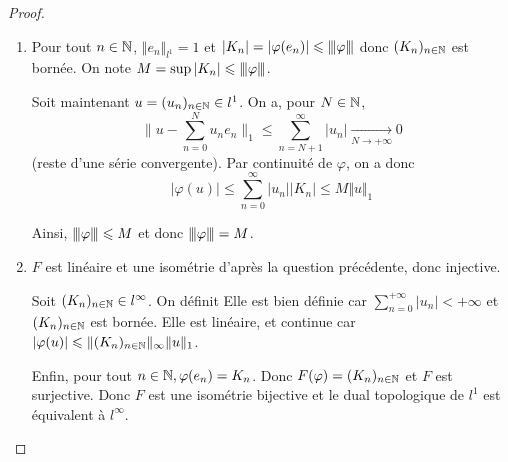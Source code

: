\begin{proof}
	\phantom{}
	\begin{enumerate}
		\item Pour tout $n\in\mathbb{N}$, $\Vert e_{n}\Vert_{l^{1}}=1$ et $\vert K_{n}\vert=\vert\varphi(e_{n})\vert\leqslant{\left\vert\kern-0.25ex\left\vert\kern-0.25ex\left\vert{}\varphi \right\vert\kern-0.25ex\right\vert\kern-0.25ex\right\vert}$ donc $(K_{n})_{n\in\mathbb{N}}$ est bornée. On note $M=\sup\vert K_{n}\vert\leqslant{\left\vert\kern-0.25ex\left\vert\kern-0.25ex\left\vert{}\varphi \right\vert\kern-0.25ex\right\vert\kern-0.25ex\right\vert}$.
		
		Soit maintenant $u=(u_{n})_{n\in\mathbb{N}}\in l^{1}$. On a, pour $N\in\mathbb{N}$, 
		\begin{equation}\Biggl\lVert u-\sum_{n=0}^{N}u_{n}e_{n}\Biggr\rVert_{1}\leqslant\sum_{n=N+1}^{\infty}\vert u_{n}\vert\xrightarrow[N\to+\infty]{}0\end{equation}
		(reste d'une série convergente). Par continuité de $\varphi$, on a donc 
		\begin{equation}\vert \varphi(u)\vert\leqslant\sum_{n=0}^{\infty}\vert u_{n}\vert \vert K_{n}\vert\leqslant M\Vert u\Vert_{1}\end{equation}

		Ainsi, ${\left\vert\kern-0.25ex\left\vert\kern-0.25ex\left\vert{}\varphi \right\vert\kern-0.25ex\right\vert\kern-0.25ex\right\vert}\leqslant M$ et donc ${\left\vert\kern-0.25ex\left\vert\kern-0.25ex\left\vert{}\varphi \right\vert\kern-0.25ex\right\vert\kern-0.25ex\right\vert}=M$.

		\item $F$ est linéaire et une isométrie d'après la question précédente, donc injective. 
		
		Soit $(K_{n})_{n\in\mathbb{N}}\in l^{\infty}$. On définit 
		Elle est bien définie car $\sum_{n=0}^{+\infty}\vert u_{n}\vert<+\infty$ et $(K_{n})_{n\in\mathbb{N}}$ est bornée. Elle est linéaire, et continue car $\vert\varphi(u)\vert\leqslant\Vert(K_{n})_{n\in\mathbb{N}}\Vert_{\infty}\Vert u\Vert_{1}$.

		Enfin, pour tout $n\in\mathbb{N},\varphi(e_{n})=K_{n}$. Donc $F(\varphi)=(K_{n})_{n\in\mathbb{N}}$ et $F$ est surjective. Donc $F$ est une isométrie bijective et le dual topologique de $l^{1}$ est équivalent à $l^{\infty}$.
	\end{enumerate}
\end{proof}

